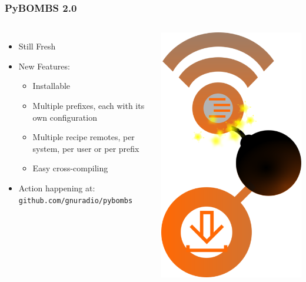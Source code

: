 \documentclass{beamer}
\begin{document}
\begin{frame}
  \frametitle{PyBOMBS 2.0}

  \begin{columns}[c]
    \column[T]{9cm}

  \begin{itemize}
    \item Still Fresh
    \item New Features:
      \begin{itemize}
        \item Installable
        \item Multiple prefixes, each with its own configuration
        \item Multiple recipe remotes, per system, per user or per prefix
        \item Easy cross-compiling
      \end{itemize}
    \item Action happening at: \texttt{github.com/gnuradio/pybombs}
  \end{itemize}
    \column[T]{2cm}
  \includegraphics[width=\textwidth]{pybombs_logo}
  \end{columns}
\end{frame}
\end{document}
